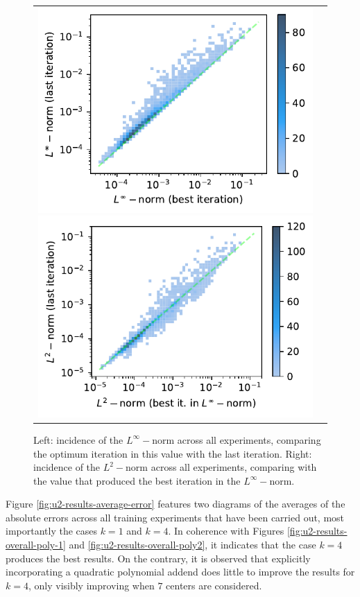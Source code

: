 \documentclass[12pt]{report} %
\begin{document}
\begin{figure}
  \hspace*{-2cm}
  \begin{tabular}{cc}
    \includegraphics[width=.6\textwidth]{imagenes/experiments/1d/statistical_1d_full_scheduler_interpolation/incidence_of_linf.pdf}
    \includegraphics[width=.6\textwidth]{imagenes/experiments/1d/statistical_1d_full_scheduler_interpolation/incidence_of_l2.pdf}
  \end{tabular}
  \caption{Left: incidence of the $L^\infty-$norm across all experiments, comparing the optimum iteration in this value with the last iteration. Right: incidence of the $L^2-$norm across all experiments, comparing with the value that produced the best iteration in the $L^\infty-$norm.}
  \label{fig:u2-results-incidence-l-norms}
\end{figure}

Figure \ref{fig:u2-results-average-error} features two diagrams of the averages of the absolute errors across all training experiments that have been carried out, most importantly the cases $k=1$ and $k=4$. In coherence with Figures \ref{fig:u2-results-overall-poly-1} and \ref{fig:u2-results-overall-poly2}, it indicates that the case $k=4$ produces the best results. On the contrary, it is observed that explicitly incorporating a quadratic polynomial addend does little to improve the results for $k=4$, only visibly improving when $7$ centers are considered.
\end{document}

